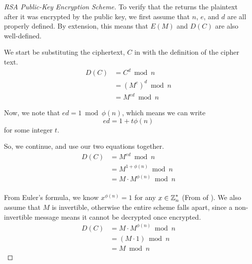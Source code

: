 \begin{proof}[RSA Public-Key Encryption Scheme]\label{proof:RSA_Public_Key_Encryption_Scheme}
  To verify that the  returns the plaintext after it was encrypted by the public key, we first assume that $n$, $e$, and $d$ are all properly defined.
  By extension, this means that $E(M)$ and $D(C)$ are also well-defined.

  We start be substituting the ciphertext, $C$ in  with the definition of the cipher text.
  \begin{equation*}
    \begin{aligned}
      D(C) &= C^{d} \bmod n \\
      &= {(M^{e})}^{d} \bmod n \\
      &= M^{ed} \bmod n
    \end{aligned}
  \end{equation*}

  Now, we note that $ed = 1 \bmod \phi(n)$, which means we can write
  \begin{equation*}
    ed = 1 + t \phi(n)
  \end{equation*}
  for some integer $t$.

  So, we continue, and use our two equations together.
  \begin{equation*}
    \begin{aligned}
      D(C) &= M^{ed} \bmod n \\
      &= M^{1 + \phi(n)} \bmod n \\
      &= M \cdot M^{\phi(n)} \bmod n \\
    \end{aligned}
  \end{equation*}

  From Euler's formula, we know $x^{\phi(n)} = 1$ for any $x \in \operatorname{\mathbb{Z}}_{n}^{*}$ (From  of ).
  We also assume that $M$ is invertible, otherwise the entire scheme falls apart, since a non-invertible message means it cannot be decrypted once encrypted.
  \begin{equation*}
    \begin{aligned}
      D(C) &= M \cdot M^{\phi(n)} \bmod n \\
      &= (M \cdot 1) \bmod n \\
      &= M \bmod n
    \end{aligned}
  \end{equation*}
\end{proof}

